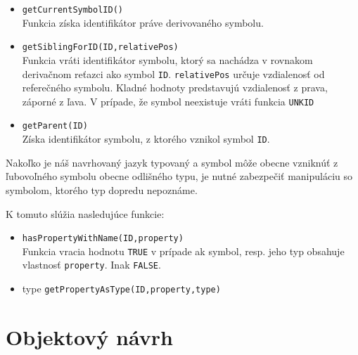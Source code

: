 \begin{itemize}
\item \texttt{getCurrentSymbolID()} \\
	Funkcia získa identifikátor práve derivovaného symbolu.
\item \texttt{getSiblingForID(ID,relativePos)} \\
	Funkcia vráti identifikátor symbolu, ktorý sa nachádza v rovnakom derivačnom reťazci ako symbol \texttt{ID}. \texttt{relativePos} určuje vzdialenosť
	od referečného symbolu. Kladné hodnoty predstavujú vzdialenosť z prava, záporné z ľava. 
	V prípade, že symbol neexistuje vráti funkcia \texttt{UNKID}
\item \texttt{getParent(ID)} \\
	Získa identifikátor symbolu, z ktorého vznikol symbol \texttt{ID}.
\end{itemize}

Nakoľko je náš navrhovaný jazyk typovaný a symbol môže obecne vzniknúť z ľubovoľného symbolu obecne odlišného typu, je nutné zabezpečiť manipuláciu so
symbolom, ktorého typ dopredu nepoznáme.

K tomuto slúžia nasledujúce funkcie:
\begin{itemize}
\item \texttt{hasPropertyWithName(ID,property)} \\
	Funkcia vracia hodnotu \texttt{TRUE} v prípade ak symbol, resp. jeho typ obsahuje vlastnosť \texttt{property}. Inak \texttt{FALSE}.
\item type \texttt{getPropertyAsType(ID,property,type)}

\end{itemize}


\section{Objektový návrh}
